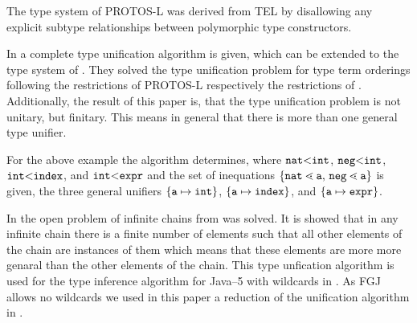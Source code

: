The type system of \textsf{PROTOS-L} \cite{CB95} was
derived from \textsf{TEL} by disallowing any explicit subtype relationships
between polymorphic type constructors. 

In \cite{CB95}
a complete type unification algorithm is given, which can be extended to the
type system of \cite{HiTo92}. They solved the type unification problem for type
term orderings following the restrictions of \textsf{PROTOS-L} respectively the
restrictions of \cite{HiTo92}. Additionally, the result of this paper is, that
the type unification problem is not unitary, but finitary. This means in
general that there is more than one general type unifier. 

For the above example the algorithm determines, where $\texttt{nat} \mbox{$<$}
\texttt{int}$, $\texttt{neg} \mbox{$<$} \texttt{int}$, $\mathtt{int} \mbox{$<$}
\mathtt{index}$, and $\mathtt{int} \mbox{$<$} \mathtt{expr}$ and the set of
inequations $\set{\mathtt{nat} \lessdot
  \mathtt{a}$, $\mathtt{neg} \lessdot \mathtt{a}}$ is given, the three general
unifiers $\{ \mathtt{a} \mapsto \texttt{int} \}$, $\{ \mathtt{a} \mapsto
  \mathtt{index} \}$, and $\{ \mathtt{a} \mapsto \mathtt{expr} \}$. 

In \cite{plue09_1} the open problem of infinite chains from \cite{GS89} was
solved. It is showed that in any infinite chain there is a finite number of elements such that
all other elements of the chain are instances of them which means that these
elements are more more genaral than the other elements of the chain. This type
unfication algorithm is used for the type inference algorithm for Java--5 with
wildcards in \cite{Plue07_3}. As FGJ allows no wildcards we used in this paper
a reduction  of the unification algorithm in \cite{plue09_1}.




